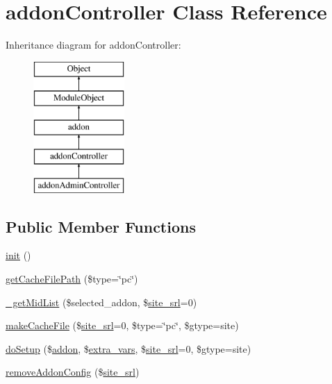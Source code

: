 \hypertarget{classaddonController}{}\section{addon\+Controller Class Reference}
\label{classaddonController}
Inheritance diagram for addon\+Controller\+:\begin{figure}[H]
\begin{center}
\leavevmode
\includegraphics[height=5.000000cm]{classaddonController}
\end{center}
\end{figure}
\subsection*{Public Member Functions}
\begin{DoxyCompactItemize}
\item 
\hyperlink{classaddonController_a11ede7aecba420c2a5c7e55d8bab4013}{init} ()
\item 
\hyperlink{classaddonController_aaad3343ec8471cab540db6ebde4c06bd}{get\+Cache\+File\+Path} (\$type=\char`\"{}pc\char`\"{})
\item 
\hyperlink{classaddonController_a7a1ed742a1dd2c4f71e56acafe31c13d}{\+\_\+get\+Mid\+List} (\$selected\+\_\+addon, \$\hyperlink{ko_8install_8php_a8b1406b4ad1048041558dce6bfe89004}{site\+\_\+srl}=0)
\item 
\hyperlink{classaddonController_a4d0e66e95c9d4a9822b03ce8df1bd545}{make\+Cache\+File} (\$\hyperlink{ko_8install_8php_a8b1406b4ad1048041558dce6bfe89004}{site\+\_\+srl}=0, \$type=\char`\"{}pc\char`\"{}, \$gtype=\textquotesingle{}site\textquotesingle{})
\item 
\hyperlink{classaddonController_ae3d4eb10131a0414973c4cdaec65c803}{do\+Setup} (\$\hyperlink{classaddon}{addon}, \$\hyperlink{ko_8install_8php_ae1dcb37fc34a8f312d2e6abd6f806743}{extra\+\_\+vars}, \$\hyperlink{ko_8install_8php_a8b1406b4ad1048041558dce6bfe89004}{site\+\_\+srl}=0, \$gtype=\textquotesingle{}site\textquotesingle{})
\item 
\hyperlink{classaddonController_ad90c76bfd8351152d3d69b287c606fe5}{remove\+Addon\+Config} (\$\hyperlink{ko_8install_8php_a8b1406b4ad1048041558dce6bfe89004}{site\+\_\+srl})
\end{DoxyCompactItemize}
